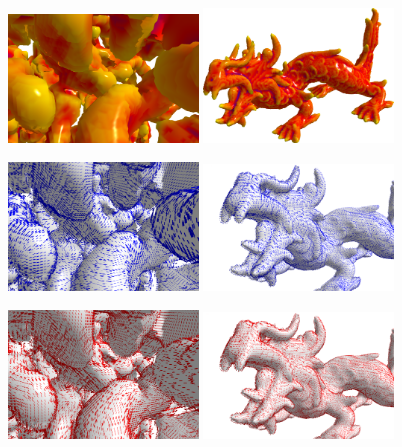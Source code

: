\documentclass{llncs}
\begin{document}
 \begin{figure}[p!]
   \vspace{-0.35cm}
   \begin{center}
   	 {\includegraphics[width=0.45\textwidth]{figs/snow_r8}}
   	 {\includegraphics[width=0.45\textwidth]{figs/xyzrgb_dragon-510_R8_mean}}

     {\includegraphics[width=0.45\textwidth]{figs/snow_r8_min}}
	 {\includegraphics[width=0.45\textwidth]{figs/dragon_r8}}

     {\includegraphics[width=0.45\textwidth]{figs/snow_r8_max}}
	 {\includegraphics[width=0.45\textwidth]{figs/dragon_r8_max}}


\end{center}
\end{figure}
\end{document}
